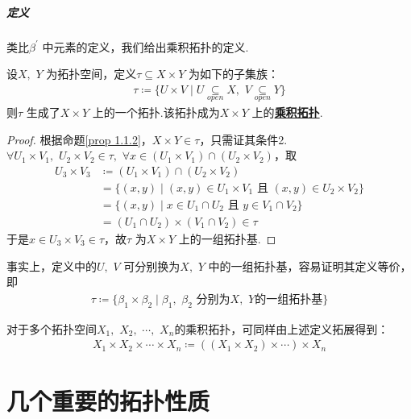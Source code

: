 \vspace*{2em}
\paragraph{定义}
	类比$\beta^{'}$ 中元素的定义，我们给出乘积拓扑的定义.
	\begin{defn}\label{def 1.3.1}
		设$X , \,\, Y$ 为拓扑空间，定义$\tau \subseteq X \times Y$ 为如下的子集族：
		\begin{align}
			\tau \coloneqq \{ U \times V \mid U \underset{open}{\subseteq} X , \,\, V \underset{open}{\subseteq} Y \}
		\end{align}
		则$\tau$ 生成了$X \times Y$ 上的一个拓扑.该拓扑成为$X \times Y$ 上的\underline{\textbf{乘积拓扑}}.
		\begin{proof}
			根据命题\ref{prop 1.1.2}，$X \times Y \in \tau$，只需证其条件2.\\
			$\forall U_1 \times V_1 , \,\, U_2 \times V_2 \in \tau , \,\, \forall x \in (U_1 \times V_1) \cap (U_2 \times V_2)$，取
			\begin{align}
				U_3 \times V_3 &\coloneqq (U_1 \times V_1) \cap (U_2 \times V_2)\\
				&= \{ (x , y) \mid (x , y) \in U_1 \times V_1 \,\, \text{且} \,\, (x , y) \in U_2 \times V_2 \} \\
				&= \{ (x , y) \mid x \in U_1 \cap U_2 \,\, \text{且} \,\, y \in V_1 \cap V_2 \} \\
				&= (U_1 \cap U_2) \times (V_1 \cap V_2) \in \tau
			\end{align}
			于是$x \in U_3 \times V_3 \in \tau$，故$\tau$ 为$X \times Y$ 上的一组拓扑基.
		\end{proof}
		\begin{rmk}
			事实上，定义中的$U , \,\, V$ 可分别换为$X , \,\, Y$ 中的一组拓扑基，容易证明其定义等价，即
			\begin{align}
				\tau \coloneqq \{ \beta_1 \times \beta_2 \mid \beta_1 , \,\, \beta_2 \,\, \text{分别为$X , \,\, Y$的一组拓扑基} \}
			\end{align}
		\end{rmk}
	\end{defn}

	对于多个拓扑空间$X_1 , \,\, X_2 , \,\,  \cdots , \,\, X_n$的乘积拓扑，可同样由上述定义拓展得到：
	\begin{align}
		X_1 \times X_2 \times \cdots \times X_n \coloneqq ( ( X_1 \times X_2 ) \times \cdots ) \times X_n 
	\end{align}

\chapter{几个重要的拓扑性质}

